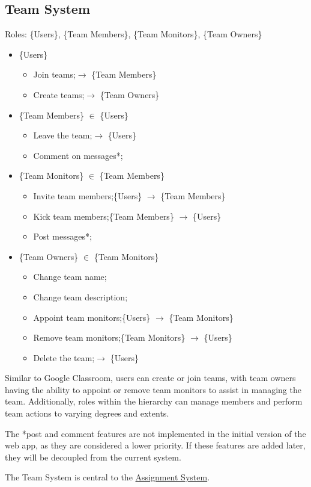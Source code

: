\documentclass[12pt]{report}
\newcommand{\n}{\par}
\newcommand{\br}{\vspace{1 em}\n}
\begin{document}
\subsection{Team System} \label{overview.project-objectives.team-system}
Roles: \{Users\}, \{Team Members\}, \{Team Monitors\}, \{Team Owners\}\n
\begin{itemize}
	\item \{Users\}
	      \begin{itemize}
		      \item Join teams;\null\hfill $\rightarrow$ \{Team Members\}
		      \item Create teams;\null\hfill $\rightarrow$ \{Team Owners\}
	      \end{itemize}
	\item \{Team Members\} $\in$ \{Users\}
	      \begin{itemize}
		      \item Leave the team;\null\hfill $\rightarrow$ \{Users\}
		      \item Comment on messages*;
	      \end{itemize}
	\item \{Team Monitors\} $\in$ \{Team Members\}
	      \begin{itemize}
		      \item Invite team members;\null\hfill \{Users\} $\rightarrow$ \{Team Members\}
		      \item Kick team members;\null\hfill \{Team Members\} $\rightarrow$ \{Users\}
		      \item Post messages*;
	      \end{itemize}
	\item \{Team Owners\} $\in$ \{Team Monitors\}
	      \begin{itemize}
		      \item Change team name;
		      \item Change team description;
		      \item Appoint team monitors;\null\hfill \{Users\} $\rightarrow$ \{Team Monitors\}
		      \item Remove team monitors;\null\hfill \{Team Monitors\} $\rightarrow$ \{Users\}
		      \item Delete the team;\null\hfill $\rightarrow$ \{Users\}
	      \end{itemize}
\end{itemize}\n
Similar to Google Classroom, users can create or join teams,
with team owners having the ability to appoint or remove team monitors to assist in managing the team.
Additionally, roles within the hierarchy can manage members and perform team actions to varying degrees and extents.
\br
The *post and comment features are not implemented in the initial version of the web app, as they are considered a lower priority.
If these features are added later, they will be decoupled from the current system.
\br
The Team System is central to the \hyperref[overview.project-objectives.assignment-system]{Assignment System}.
\end{document}
